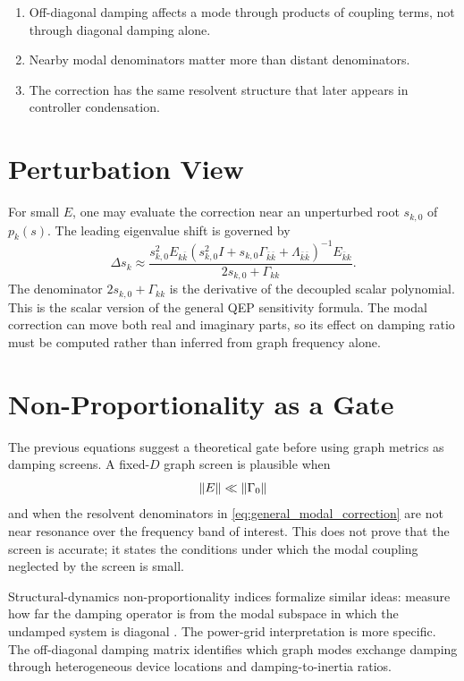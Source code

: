 \begin{enumerate}
\item Off-diagonal damping affects a mode through products of coupling terms,
not through diagonal damping alone.
\item Nearby modal denominators matter more than distant denominators.
\item The correction has the same resolvent structure that later appears in
controller condensation.
\end{enumerate}

\section{Perturbation View}

For small \(E\), one may evaluate the correction near an unperturbed root
\(s_{k,0}\) of \(p_k(s)\). The leading eigenvalue shift is governed by
\begin{equation}
  \Delta s_k
  \approx
  \frac{
  s_{k,0}^2E_{k\bar k}
  \left(s_{k,0}^2I+s_{k,0}\Gamma_{\bar k\bar k}
  +\Lambda_{\bar k\bar k}\right)^{-1}
  E_{\bar k k}
  }{
  2s_{k,0}+\Gamma_{kk}
  }.
  \label{eq:nonprop_shift}
\end{equation}
The denominator \(2s_{k,0}+\Gamma_{kk}\) is the derivative of the decoupled
scalar polynomial. This is the scalar version of the general QEP sensitivity
formula. The modal correction can move both real and imaginary parts, so its
effect on damping ratio must be computed rather than inferred from graph
frequency alone.

\section{Non-Proportionality as a Gate}

The previous equations suggest a theoretical gate before using graph metrics as
damping screens. A fixed-\(D\) graph screen is plausible when
\begin{equation}
  \left\lVert E \right\rVert\ll\left\lVert \Gamma_0 \right\rVert
  \label{eq:small_nonprop_gate_1}
\end{equation}
and when the resolvent denominators in
\eqref{eq:general_modal_correction} are not near resonance over the frequency
band of interest. This does not prove that the screen is accurate; it states
the conditions under which the modal coupling neglected by the screen is small.

Structural-dynamics non-proportionality indices formalize similar ideas:
measure how far the damping operator is from the modal subspace in which the
undamped system is diagonal \cite{conde2021nonproportionality}. The power-grid
interpretation is more specific. The off-diagonal damping matrix identifies
which graph modes exchange damping through heterogeneous device locations and
damping-to-inertia ratios.

